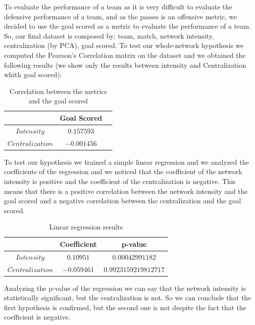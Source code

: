 \documentclass[12pt, a4paper]{article}
\begin{document}
To evaluate the performance of a team as it is very difficult to evaluate the defensive performance of a team, and as the passes is an offensive metric, we decided to use the goal scored as a metric to evaluate the performance of a team. \\
So, our final dataset is composed by: team, match, network intensity, centralization (by PCA), goal scored.
To test our whole-network hypothesis we computed the Pearson's Correlation matrix on the dataset and we obtained the following results (we show only the results between intensity and Centralization whith goal scored):
\begin{table}[H]
        \centering
        \begin{tabular}{|c|c|c|}
                \hline
                & \textbf{Goal Scored}  \\
                \hline
                $Intensity$  &  $0.157593$  \\
                \hline
                $Centralization$  &  $-0.001456$ \\
                \hline
        \end{tabular}
        \caption{Correlation between the metrics and the goal scored}
    \end{table}

To test our hypothesis we trained a simple linear regression and we analyzed the coefficients of the regression and we noticed that the coefficient of the network intensity is positive and the coefficient of the centralization is negative. This means that there is a positive correlation between the network intensity and the goal scored and a negative correlation between the centralization and the goal scored. \\

\begin{table}[H]
    \centering
    \begin{tabular}{|c|c|c|}
            \hline
            & \textbf{Coefficient} & \textbf{p-value} \\
            \hline
            $Intensity$  &  $0.10951$ & $0.00042991182$  \\
            \hline
            $Centralization$  &  $-0.059461$  &  $0.9923159219812717$ \\
            \hline
    \end{tabular}
    \caption{Linear regression results}
\end{table}

Analyzing the p-value of the regression we can say that the network intensity is statistically significant, but the centralization is not. So we can conclude that the first hypothesis is confirmed, but the second one is not despite the fact that the coefficient is negative. \\
\end{document}

